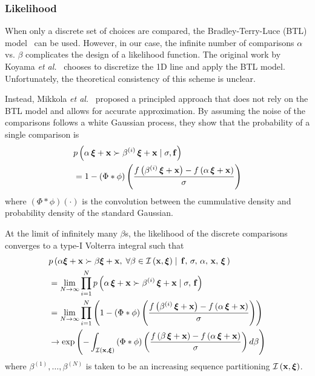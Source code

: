 \subsubsection{Likelihood}
When only a discrete set of choices are compared, the Bradley-Terry-Luce (BTL) model~\cite{10.1145/3072959.3073598} can be used.
However, in our case, the infinite number of comparisons \(\alpha\) vs. \(\beta\) complicates the design of a likelihood function.
The original work by Koyama \textit{et al.}~\cite{koyama_sequential_2020} chooses to discretize the 1D line and apply the BTL model.
Unfortunately, the theoretical consistency of this scheme is unclear.

Instead, Mikkola \textit{et al.}~\cite{pmlr-v119-mikkola20a} proposed a principled approach that does not rely on the BTL model and allows for accurate approximation.
By assuming the noise of the comparisons follows a white Gaussian process, they show that the probability of a single comparison is
\begin{align*}
  &p\left(\alpha \, \bm{\xi} + \mathbf{x} \succ \beta^{(i)} \, \bm{\xi} + \mathbf{x} \mid \sigma, \mathbf{f} \right) \\
  &= 1 - \left(\Phi * \phi \right)\left( \frac{ f\left(\beta^{(i)} \, \bm{\xi} + \mathbf{x} \right) - f\left(\alpha \, \bm{\xi} + \mathbf{x} \right) }{\sigma} \right)
\end{align*}
{\noindent}where \(\left(\Phi*\phi\right)\left(\cdot\right)\) is the convolution between the cummulative density and probability density of the standard Gaussian. 

At the limit of infinitely many \(\beta\)s, the likelihood of the discrete comparisons converges to a type-I Volterra integral such that
{\small
\begin{align*}
  &p\left(\alpha \bm{\xi} + \mathbf{x} \succ \beta \bm{\xi} + \mathbf{x},\; \forall \beta \in \mathcal{I}\left(\mathbf{x}, \bm{\xi}\right) \mid\, \mathbf{f},\, \sigma,\, \alpha,\, \mathbf{x},\, \bm{\xi}\,\right)  \\
  &= \lim_{N \rightarrow \infty} \prod^{N}_{i=1} p\left(\alpha \, \bm{\xi} + \mathbf{x} \succ \beta^{(i)} \, \bm{\xi} + \mathbf{x} \mid \sigma,\, \mathbf{f} \right) \\
  &= \lim_{N \rightarrow \infty} \prod^{N}_{i=1} \left(  1 - \left(\Phi * \phi \right)\left( \frac{ f\left(\beta^{(i)} \, \bm{\xi} + \mathbf{x} \right) - f\left(\alpha \, \bm{\xi} + \mathbf{x} \right) }{\sigma} \right) \right) \\
  &\rightarrow \exp\left(  - \int_{\mathcal{I}\left(\mathbf{x}, \bm{\xi}\right)} \left(\Phi * \phi \right) \left( \frac{ f\left(\beta \, \bm{\xi} + \mathbf{x} \right) - f\left(\alpha \, \bm{\xi} + \mathbf{x} \right) }{\sigma} \right) d\beta \right)
\end{align*}
}%
%
{\noindent}where \(\beta^{(1)}, \ldots, \beta^{(N)}\) is taken to be an increasing sequence partitioning \(\mathcal{I\left(\mathbf{x}, \bm{\xi}\right)}\).

